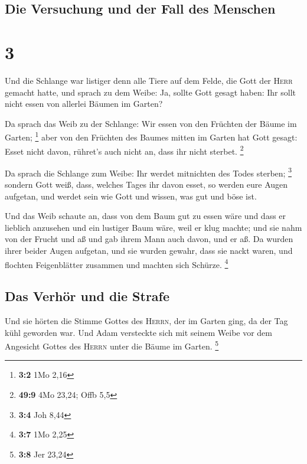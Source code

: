 \hypertarget{die-versuchung-und-der-fall-des-menschen}{%
\subsection{Die Versuchung und der Fall des
Menschen}\label{die-versuchung-und-der-fall-des-menschen}}

\hypertarget{section-2}{%
\section{3}\label{section-2}}

 Und die Schlange war listiger denn alle Tiere auf dem
Felde, die Gott der \textsc{Herr} gemacht hatte, und sprach zu dem
Weibe: Ja, sollte Gott gesagt haben: Ihr sollt nicht essen von allerlei
Bäumen im Garten?

 Da sprach das Weib zu der Schlange: Wir essen von den
Früchten der Bäume im Garten; \footnote{\textbf{3:2} 1Mo 2,16}
 aber von den Früchten des Baumes mitten im Garten hat
Gott gesagt: Esset nicht davon, rühret's auch nicht an, dass ihr nicht
sterbet. \footnote{\textbf{49:9} 4Mo 23,24; Offb 5,5}

 Da sprach die Schlange zum Weibe: Ihr werdet mitnichten
des Todes sterben; \footnote{\textbf{3:4} Joh 8,44} 
sondern Gott weiß, dass, welches Tages ihr davon esset, so werden eure
Augen aufgetan, und werdet sein wie Gott und wissen, was gut und böse
ist.

 Und das Weib schaute an, dass von dem Baum gut zu essen
wäre und dass er lieblich anzusehen und ein lustiger Baum wäre, weil er
klug machte; und sie nahm von der Frucht und aß und gab ihrem Mann auch
davon, und er aß.  Da wurden ihrer beider Augen aufgetan,
und sie wurden gewahr, dass sie nackt waren, und flochten Feigenblätter
zusammen und machten sich Schürze. \footnote{\textbf{3:7} 1Mo 2,25}

\hypertarget{das-verhuxf6r-und-die-strafe}{%
\subsection{Das Verhör und die
Strafe}\label{das-verhuxf6r-und-die-strafe}}

 Und sie hörten die Stimme Gottes des \textsc{Herrn}, der
im Garten ging, da der Tag kühl geworden war. Und Adam versteckte sich
mit seinem Weibe vor dem Angesicht Gottes des \textsc{Herrn} unter die
Bäume im Garten. \footnote{\textbf{3:8} Jer 23,24}


